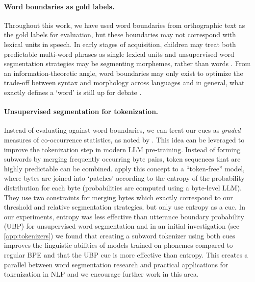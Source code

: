 \paragraph{Word boundaries as gold labels.} Throughout this work, we have used word boundaries from orthographic text as the gold labels for evaluation, but these boundaries may not correspond with lexical units in speech. In early stages of acquisition, children may treat both predictable multi-word phrases as single lexical units \citep{macwhinney1978} and unsupervised word segmentation strategies may be segmenting morphemes, rather than words \citep{fleck2008lexicalized}. From an information-theoretic angle, word boundaries may only exist to optimize the trade-off between syntax and morphology across languages \citep{koplenig2017statistical, mosteiro2025word} and in general, what exactly defines a `word' is still up for debate \citep{dixon2002word, haspelmath2023defining}. 

\paragraph{Unsupervised segmentation for tokenization.} Instead of evaluating against word boundaries, we can treat our cues as \emph{graded} measures of co-occurrence statistics, as noted by \citet{elman-1990-finding}. This idea can be leveraged to improve the tokenization step in modern LLM pre-training. Instead of forming subwords by merging frequently occurring byte pairs, token sequences that are highly predictable can be combined. \citet{pagnoni2024byte} apply this concept to a ``token-free'' model, where bytes are joined into `patches' according to the entropy of the probability distribution for each byte (probabilities are computed using a byte-level LLM). They use two constraints for merging bytes which exactly correspond to our threshold and relative segmentation strategies, but only use entropy as a cue. In our experiments, entropy was less effective than utterance boundary probability (UBP) for unsupervised word segmentation and in an initial investigation (see \cref{app:tokenizers}) we found that creating a subword tokenizer using both cues improves the linguistic abilities of models trained on phonemes compared to regular BPE and that the UBP cue is more effective than entropy. This creates a parallel between word segmentation research and practical applications for tokenization in NLP and we encourage further work in this area.





